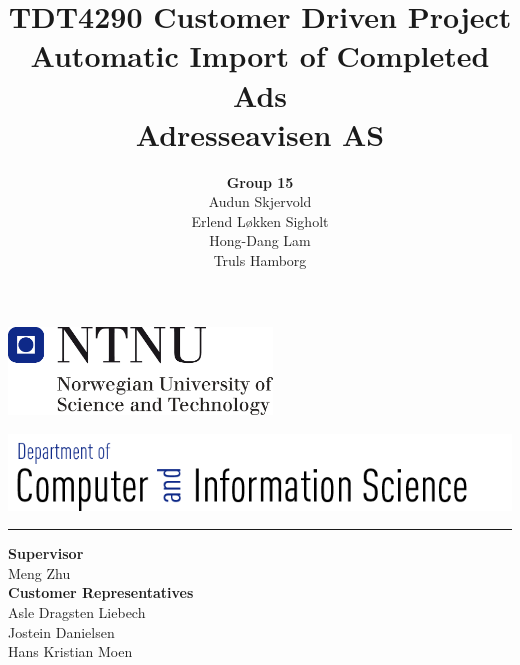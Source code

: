 \documentclass[12pt, a4paper]{article}
\title{\normalsize TDT4290 Customer Driven Project \\ \LARGE \textbf{Automatic Import of Completed Ads} \normalsize \\Adresseavisen AS}
\author{\Large \textbf{Group 15} \normalsize\\Audun Skjervold \\ Erlend Løkken Sigholt \\ Hong-Dang Lam \\ Truls Hamborg}
\begin{document}
\maketitle \hspace{-0.5cm}
\begin{center}
\includegraphics[width=7cm]{images/ntnulogo}\\ 
\end{center}
\includegraphics[width=17cm]{images/idilogo}\\\hrule

\begin{center}
\textbf{Supervisor}\\ Meng Zhu\\
\textbf{Customer Representatives}\\ Asle Dragsten Liebech \\
Jostein Danielsen\\
Hans Kristian Moen\\
\end{center}
\thispagestyle{empty}
\newpage




\tableofcontents
\newpage

\listoffigures
\newpage

\listoftables
\newpage












\end{document}
